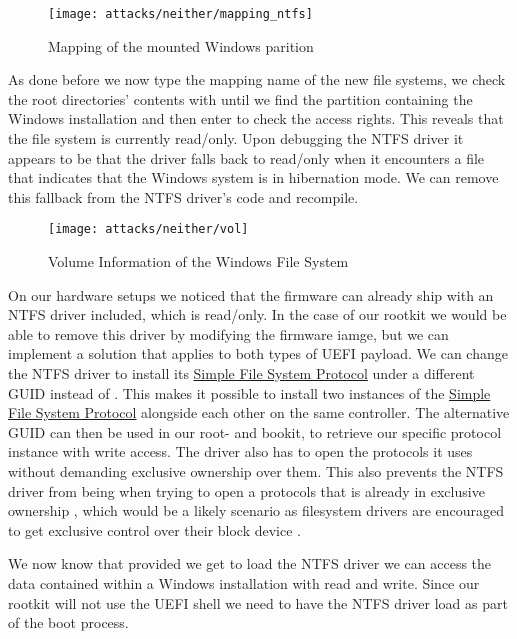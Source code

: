 \begin{figure}[htb]
    \centering
    \texttt{[image: attacks/neither/mapping\_ntfs]}
    \caption{Mapping of the mounted Windows parition}
    \label{fig:mapping-ntfs}
\end{figure}

As done before we now type the mapping name of the new file systems, we check the root directories' contents with  until we find the partition containing the Windows installation and then enter  to check the access rights.
This reveals that the file system is currently read\-/only.
Upon debugging the \ac{NTFS} driver it appears to be that the driver falls back to read\-/only when it encounters a file that indicates that the Windows system is in hibernation mode.
We can remove this fallback from the \ac{NTFS} driver's code and recompile.


\begin{figure}[htb]
    \centering
    \texttt{[image: attacks/neither/vol]}
    \caption{Volume Information of the Windows File System}
    \label{fig:mapping-ntfs}
\end{figure}

On our hardware setups we noticed that the firmware can already ship with an \ac{NTFS} driver included, which is read\-/only.
In the case of our rootkit we would be able to remove this driver by modifying the firmware iamge, but we can implement a solution that applies to both types of \ac{UEFI} payload.
We can change the \ac{NTFS} driver to install its \hyperref[lst:simple-file-system-protocol]{Simple File System Protocol} under a different \ac{GUID} instead of .
This makes it possible to install two instances of the \hyperref[lst:simple-file-system-protocol]{Simple File System Protocol} alongside each other on the same controller.
The alternative \ac{GUID} can then be used in our root- and bookit, to retrieve our specific protocol instance with write access.
The driver also has to open the protocols it uses without demanding exclusive ownership over them.
This also prevents the \ac{NTFS} driver from being when trying to open a protocols that is already in exclusive ownership \cite[Section 7.3]{uefi-spec}, which would be a likely scenario as filesystem drivers are encouraged to get exclusive control over their block device \cite[Section 13.5]{uefi-spec}.

We now know that provided we get to load the \ac{NTFS} driver we can access the data contained within a Windows installation with read and write.
 Since our rootkit will not use the UEFI shell we need to have the \ac{NTFS} driver load as part of the boot process.

